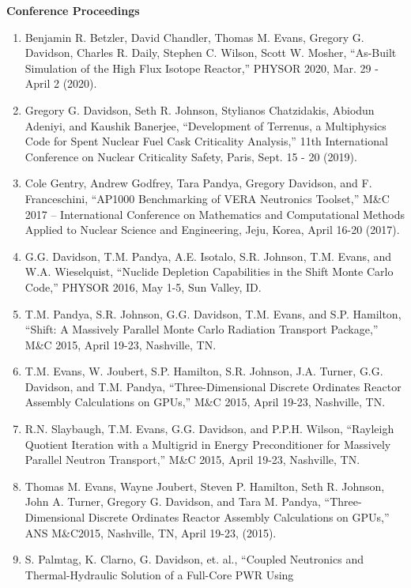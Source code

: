\documentclass[letterpaper,11pt]{article}
\newcommand{\leftsubheading}[1]{
  \textbf{#1\vspace{-6pt} \\}}
\begin{document}
\leftsubheading{Conference Proceedings}
\begin{enumerate}
  \item Benjamin R. Betzler, David Chandler, Thomas M. Evans, Gregory
    G. Davidson, Charles R. Daily, Stephen C. Wilson, Scott W. Mosher,
    ``As-Built Simulation of the High Flux Isotope Reactor,'' PHYSOR
    2020, Mar. 29 - April 2 (2020).
  \item Gregory G. Davidson, Seth R. Johnson, Stylianos Chatzidakis,
    Abiodun Adeniyi, and Kaushik Banerjee, ``Development of Terrenus,
    a Multiphysics Code for Spent Nuclear Fuel Cask Criticality
    Analysis,'' 11th International Conference on Nuclear Criticality
    Safety, Paris, Sept. 15 - 20 (2019).
  \item Cole Gentry, Andrew Godfrey, Tara Pandya, Gregory Davidson, and
    F. Franceschini, ``AP1000 Benchmarking of VERA Neutronics
    Toolset,'' M\&C 2017 – International Conference on Mathematics and
    Computational Methods Applied to Nuclear Science and Engineering,
    Jeju, Korea, April 16-20 (2017).
  \item G.G. Davidson, T.M. Pandya, A.E. Isotalo, S.R. Johnson,
    T.M. Evans, and W.A. Wieselquist, ``Nuclide Depletion Capabilities
    in the Shift Monte Carlo Code,'' PHYSOR 2016, May 1-5, Sun Valley,
    ID.
  \item T.M. Pandya, S.R. Johnson, G.G. Davidson, T.M. Evans, and
    S.P. Hamilton, ``Shift: A Massively Parallel Monte Carlo Radiation
    Transport Package,'' M\&C 2015, April 19-23, Nashville, TN.
  \item T.M. Evans, W. Joubert, S.P. Hamilton, S.R. Johnson,
    J.A. Turner, G.G. Davidson, and T.M. Pandya, ``Three-Dimensional
    Discrete Ordinates Reactor Assembly Calculations on GPUs,'' M\&C
    2015, April 19-23, Nashville, TN.
  \item R.N. Slaybaugh, T.M. Evans, G.G. Davidson, and P.P.H. Wilson,
    ``Rayleigh Quotient Iteration with a Multigrid in Energy
    Preconditioner for Massively Parallel Neutron Transport,'' M\&C
    2015, April 19-23, Nashville, TN.
  \item Thomas M. Evans, Wayne Joubert, Steven P. Hamilton, Seth
    R. Johnson, John A. Turner, Gregory G. Davidson, and Tara
    M. Pandya, ``Three-Dimensional Discrete Ordinates Reactor
    Assembly Calculations on GPUs,'' ANS M\&C2015, Nashville, TN,
    April 19-23, (2015).
  \item S. Palmtag, K. Clarno, G. Davidson, et. al., ``Coupled
    Neutronics and Thermal-Hydraulic Solution of a Full-Core PWR Using

\end{enumerate}
\end{document}
